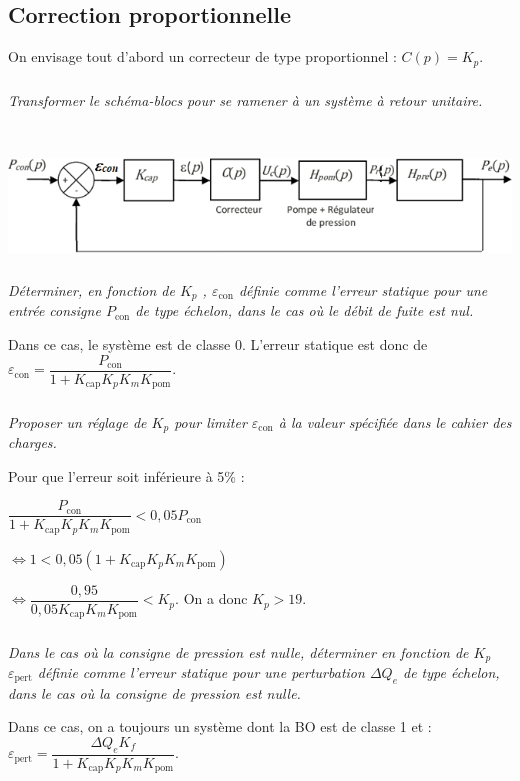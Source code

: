 \documentclass[10pt,fleqn]{article} %
\begin{document}
\begin{multicols}{2}
\subsection*{Correction proportionnelle}
On envisage tout d’abord un correcteur de type proportionnel : $C(p)=K_p$. 



\subparagraph{}
\textit{Transformer le schéma-blocs pour se ramener à un système à retour unitaire.}
\ifprof
\begin{corrige}~\\

\begin{center}
\includegraphics[width=\linewidth]{images/cor_01}
\end{center}
\end{corrige}
\else
\fi

\subparagraph{}
\textit{Déterminer, en fonction de $K_p$ , $\varepsilon_{\text{con}}$ définie comme l’erreur statique pour une entrée consigne $P_{\text{con}}$ de type échelon, dans le cas où le débit de fuite est nul.}
\ifprof
\begin{corrige}
Dans ce cas, le système est de classe 0. L'erreur statique est donc de $\varepsilon_{\text{con}}=\dfrac{P_{\text{con}}}{1+K_{\text{cap}}K_pK_mK_{\text{pom}}}$.
\end{corrige}
\else
\fi

\subparagraph{}
\textit{Proposer un réglage de $K_p$ pour limiter $\varepsilon_{\text{con}}$ à la valeur spécifiée dans le  cahier des charges.}
\ifprof
\begin{corrige}

Pour que l'erreur soit inférieure à 5\% : 

$\dfrac{P_{\text{con}}}{1+K_{\text{cap}}K_pK_mK_{\text{pom}}}<0,05 P_{\text{con}}$

$\Leftrightarrow 1<0,05 \left(1+K_{\text{cap}}K_pK_mK_{\text{pom}}\right)$

$\Leftrightarrow \dfrac{0,95}{0,05K_{\text{cap}}K_mK_{\text{pom}}}<K_p$.
On a donc $K_p>19$.
\end{corrige} 
\else
\fi

\subparagraph{}
\textit{Dans le cas où la consigne de pression est nulle,  déterminer en fonction de $K_p$  $\varepsilon_{\text{pert}}$ définie comme l’erreur statique pour une perturbation $\Delta Q_e$ de type échelon, dans le cas où la consigne de pression est nulle.}
\ifprof
\begin{corrige}
Dans ce cas, on a toujours un système dont la BO est de classe 1 et : 
$\varepsilon_{\text{pert}}=\dfrac{\Delta Q_e K_f}{1+K_{\text{cap}}K_pK_mK_{\text{pom}}}$.


\end{corrige}
\end{multicols}
\end{document}

